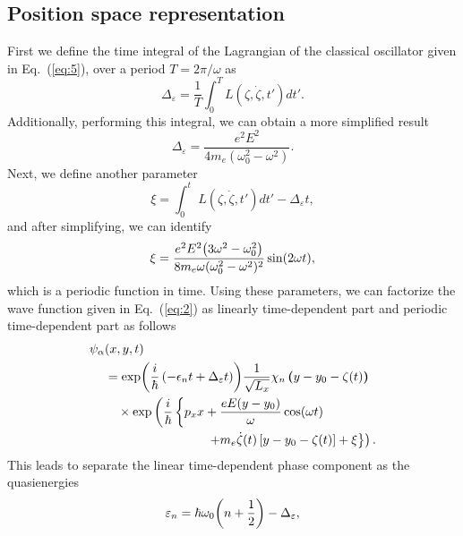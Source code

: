 \documentclass[
 reprint,
 amsmath,amssymb,
 aps,
 prb,
]{revtex4-2}
\begin{document}
\subsection{Position space representation}

First we define the time integral of the Lagrangian of the classical oscillator given in Eq.~(\ref{eq:5}), over a period $T=2\pi/\omega$ as
\begin{equation} \label{eq:b1}
  \Delta_{\varepsilon} = \frac{1}{T} \int_0^T L(\zeta,\dot{\zeta},t') dt'.
\end{equation}
Additionally, performing this integral, we can obtain a more simplified result
\begin{equation} \label{eq:b2}
  \Delta_{\varepsilon} = \frac{e^2E^2}{4m_e(\omega_0^2 - \omega^2)}.
\end{equation}
Next, we define another parameter
\begin{equation} \label{eq:b3}
  \xi =
  \int_0^t \; L(\zeta,\dot{\zeta},t') dt' -
  \Delta_{\varepsilon} t,
\end{equation}
and after simplifying, we can identify
\begin{equation} \label{eq:b4}
  \xi =
  \frac{e^2E^2\qty(3\omega^2 - \omega_0^2)}{8m_e\omega(\omega_0^2 - \omega^2)^2} \sin(2\omega t),
\end{equation}
which is a periodic function in time. Using these parameters, we can factorize the wave function given in Eq.~(\ref{eq:2}) as linearly time-dependent part and periodic time-dependent part as follows
\begin{equation} \label{eq:b5}
  \begin{aligned}
    \psi_{\alpha}&(x,y,t) \\
    & =
    \exp(\frac{i}{\hbar} \left(-\epsilon_nt + \Delta_{\varepsilon} t \right) )
    \frac{1}{\sqrt{L_x}} \chi_n\bm{\left(}y - y_0 - \zeta(t)\bm{\right)}
    \\
    & \quad\times
    \exp \left(
       \frac{i}{\hbar}
       \left\{
       p_x x +
       \frac{eE(y-y_0)}{\omega}\cos(\omega t)  \right. \right. \\
    & \left. \left. \qquad\qquad\qquad\qquad
    + m_e\dot{\zeta}(t) \left[ y-y_0 -\zeta(t) \right]
    + \xi \right\}
     \right).
  \end{aligned}
\end{equation}
This leads to separate the linear time-dependent phase component as the quasienergies
\begin{equation} \label{eq:b6}
  \varepsilon_{n} =
  \hbar \omega_0\qty(n + \frac{1}{2}) - \Delta_{\varepsilon},
\end{equation}
\end{document}
